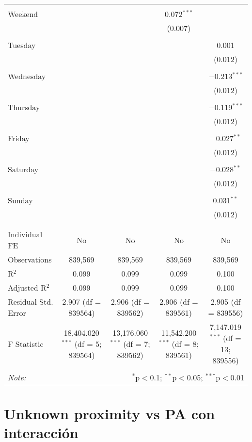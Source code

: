 \documentclass[
]{article}
\begin{document}
\begin{table}[!htbp]
{\begin{tabular}{@{\extracolsep{5pt}}lcccc}
  & & & & \\ 
 Weekend &  &  & 0.072$^{***}$ &  \\ 
  &  &  & (0.007) &  \\ 
  & & & & \\ 
 Tuesday &  &  &  & 0.001 \\ 
  &  &  &  & (0.012) \\ 
  & & & & \\ 
 Wednesday &  &  &  & $-$0.213$^{***}$ \\ 
  &  &  &  & (0.012) \\ 
  & & & & \\ 
 Thursday &  &  &  & $-$0.119$^{***}$ \\ 
  &  &  &  & (0.012) \\ 
  & & & & \\ 
 Friday &  &  &  & $-$0.027$^{**}$ \\ 
  &  &  &  & (0.012) \\ 
  & & & & \\ 
 Saturday &  &  &  & $-$0.028$^{**}$ \\ 
  &  &  &  & (0.012) \\ 
  & & & & \\ 
 Sunday &  &  &  & 0.031$^{**}$ \\ 
  &  &  &  & (0.012) \\ 
  & & & & \\ 
\hline \\[-1.8ex] 
Individual FE & No & No & No & No \\ 
Observations & 839,569 & 839,569 & 839,569 & 839,569 \\ 
R$^{2}$ & 0.099 & 0.099 & 0.099 & 0.100 \\ 
Adjusted R$^{2}$ & 0.099 & 0.099 & 0.099 & 0.100 \\ 
Residual Std. Error & 2.907 (df = 839564) & 2.906 (df = 839562) & 2.906 (df = 839561) & 2.905 (df = 839556) \\ 
F Statistic & 18,404.020$^{***}$ (df = 5; 839564) & 13,176.060$^{***}$ (df = 7; 839562) & 11,542.200$^{***}$ (df = 8; 839561) & 7,147.019$^{***}$ (df = 13; 839556) \\ 
\hline 
\hline \\[-1.8ex] 
\textit{Note:}  & \multicolumn{4}{r}{$^{*}$p$<$0.1; $^{**}$p$<$0.05; $^{***}$p$<$0.01} \\ 
\end{tabular}
} 
\end{table} 
\newpage
\section{Unknown proximity vs PA con interacción}
\end{document}
